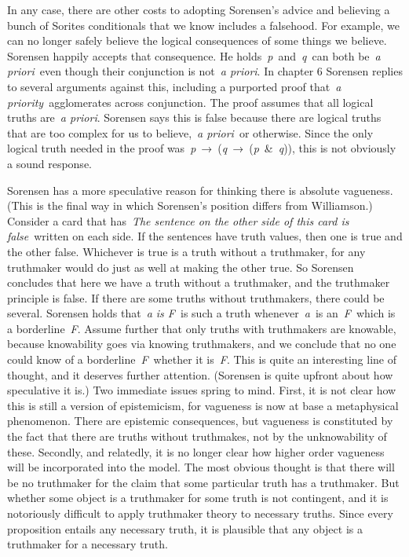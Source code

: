 \documentclass[
  11pt,
  letterpaper,
  DIV=11,
  numbers=noendperiod,
  twoside]{scrartcl}
\begin{document}
In any case, there are other costs to adopting Sorensen's advice and
believing a bunch of Sorites conditionals that we know includes a
falsehood. For example, we can no longer safely believe the logical
consequences of some things we believe. Sorensen happily accepts that
consequence. He holds~\emph{p}~and~\emph{q}~can both be~\emph{a
priori}~even though their conjunction is not~\emph{a priori}. In chapter
6 Sorensen replies to several arguments against this, including a
purported proof that~\emph{a priority}~agglomerates across conjunction.
The proof assumes that all logical truths are~\emph{a priori}. Sorensen
says this is false because there are logical truths that are too complex
for us to believe,~\emph{a priori}~or otherwise. Since the only logical
truth needed in the proof
was~\emph{p}~→~(\emph{q}~→~(\emph{p}~\&~\emph{q})), this is not
obviously a sound response.

Sorensen has a more speculative reason for thinking there is absolute
vagueness. (This is the final way in which Sorensen's position differs
from Williamson.) Consider a card that has~\emph{The sentence on the
other side of this card is false}~written on each side. If the sentences
have truth values, then one is true and the other false. Whichever is
true is a truth without a truthmaker, for any truthmaker would do just
as well at making the other true. So Sorensen concludes that here we
have a truth without a truthmaker, and the truthmaker principle is
false. If there are some truths without truthmakers, there could be
several. Sorensen holds that~\emph{a is F}~is such a truth
whenever~\emph{a}~is an~\emph{F}~which is a borderline~\emph{F}. Assume
further that only truths with truthmakers are knowable, because
knowability goes via knowing truthmakers, and we conclude that no one
could know of a borderline~\emph{F}~whether it is~\emph{F}. This is
quite an interesting line of thought, and it deserves further attention.
(Sorensen is quite upfront about how speculative it is.) Two immediate
issues spring to mind. First, it is not clear how this is still a
version of epistemicism, for vagueness is now at base a metaphysical
phenomenon. There are epistemic consequences, but vagueness is
constituted by the fact that there are truths without truthmakes, not by
the unknowability of these. Secondly, and relatedly, it is no longer
clear how higher order vagueness will be incorporated into the model.
The most obvious thought is that there will be no truthmaker for the
claim that some particular truth has a truthmaker. But whether some
object is a truthmaker for some truth is not contingent, and it is
notoriously difficult to apply truthmaker theory to necessary truths.
Since every proposition entails any necessary truth, it is plausible
that any object is a truthmaker for a necessary truth.
\end{document}
